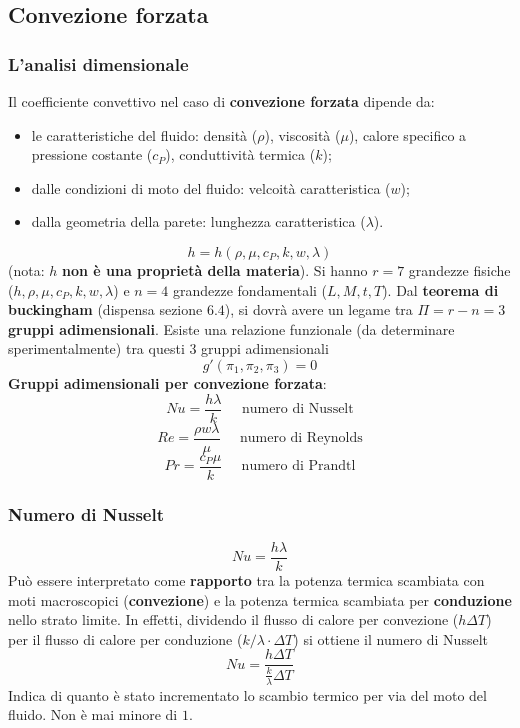 \subsection{Convezione forzata}
\subsubsection{L'analisi dimensionale}
Il coefficiente convettivo nel caso di \textbf{convezione forzata} dipende da:
\begin{itemize}
    \item le caratteristiche del fluido: densità ($\rho$), viscosità ($\mu$), calore specifico a pressione costante ($c_P$), conduttività termica ($k$);
    \item dalle condizioni di moto del fluido: velcoità caratteristica ($w$);
    \item dalla geometria della parete: lunghezza caratteristica ($\lambda$).
\end{itemize}
\[
    h = h(\rho, \mu, c_P, k , w , \lambda)
\]
(nota: $h$ \textbf{non è una proprietà della materia}).\newline
\newline
Si hanno $r= 7$ grandezze fisiche ($h, \rho, \mu, c_P, k , w , \lambda$) e $n = 4$ grandezze fondamentali ($L,M,t,T$). \newline
\newline
Dal \textbf{teorema di buckingham} (dispensa sezione $6.4$), si dovrà avere un legame tra $\Pi = r - n = 3$ \textbf{gruppi adimensionali}.\newline
\newline
Esiste una relazione funzionale (da determinare sperimentalmente) tra questi $3$ gruppi adimensionali
\[
    g'(\pi_1, \pi_2, \pi_3) = 0
\]
\textbf{Gruppi adimensionali per convezione forzata}:
\[
    Nu = \frac{h\lambda}{k} \;\;\;\;\; \text{numero di Nusselt}
\]
\[
    Re = \frac{\rho w \lambda}{\mu} \;\;\;\;\;\text{numero di Reynolds}
\]
\[
    Pr = \frac{c_P \mu}{k} \;\;\;\;\;\text{numero di Prandtl}
\]
\subsubsection{Numero di Nusselt}
\[
    Nu = \frac{h\lambda}{k}
\]
Può essere interpretato come \textbf{rapporto} tra la potenza termica
scambiata con moti macroscopici (\textbf{convezione}) e la potenza
termica scambiata per \textbf{conduzione} nello strato limite. \newline
\newline
In effetti, dividendo il flusso di calore per convezione ($h \Delta T$)
per il flusso di calore per conduzione ($k / \lambda \cdot \Delta T$) si ottiene
il numero di Nusselt
\[
    Nu = \frac{h\Delta T}{\frac{k}{\lambda}\Delta T}
\]
Indica di quanto è stato incrementato lo scambio termico
per via del moto del fluido.\newline
\newline
Non è mai minore di $1$.
